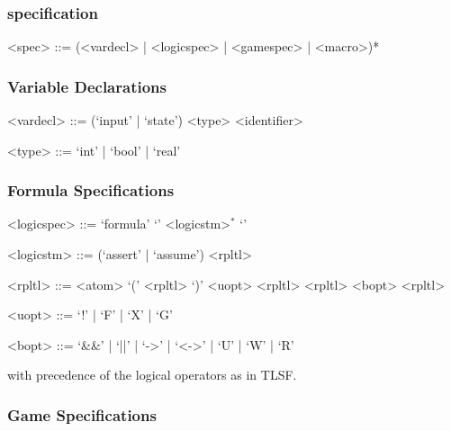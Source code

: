 \subsubsection{\issy  specification}


\begin{grammar}

<spec> ::= (<vardecl> | <logicspec> | <gamespec> | <macro>)*
 
\end{grammar}

\subsubsection{Variable Declarations}


\begin{grammar}

<vardecl> ::= (`input' | `state') <type> <identifier> 

 <type>    ::= `int' | `bool' | `real'

\end{grammar}

\subsubsection{Formula Specifications}

\begin{grammar}

<logicspec> ::=  `formula' `{' <logicstm>$^*$  `}'  

 <logicstm> ::= (`assert' | `assume') <rpltl>

<rpltl>    ::=  <atom> \alt `(' <rpltl> `)' \alt <uopt> <rpltl> \alt <rpltl> <bopt> <rpltl>

<uopt>    ::= `!' | `F' | `X' | `G'

<bopt>    ::= `&&' | `||' | `->' | `<->' | `U' | `W' | `R'

\end{grammar}

\noindent
with precedence of the logical operators as  in TLSF.


\subsubsection{Game Specifications}

